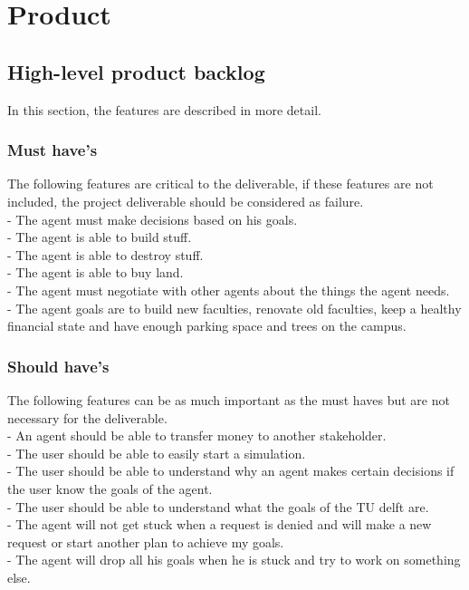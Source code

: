 \section{Product}
\subsection{High-level product backlog}
In this section, the features are described in more detail.

\subsubsection{Must have's}
The following features are critical to the deliverable, if these features are not included, the project deliverable should be considered as failure.\\
\indent	-        The agent must make decisions based on his goals.\\
\indent	-        The agent is able to build stuff.\\
\indent	-        The agent is able to destroy stuff.\\
\indent	-        The agent is able to buy land.\\
\indent	-        The agent must negotiate with other agents about the things the agent 
\indent		needs.\\
\indent	-        The agent goals are to build new faculties, renovate old faculties, keep 
\indent	a healthy financial state and have enough parking space and trees on the
\indent campus.

\subsubsection{Should have's}
The following features can be as much important as the must haves but are not necessary for the deliverable.\\
\indent-        An agent should be able to transfer money to another stakeholder.\\
\indent-        The user should be able to easily start a simulation.\\
\indent-        The user should be able to understand why an agent makes certain 
\indent		decisions if the user know the goals of the agent.\\
\indent-        The user should be able to understand what the goals of the TU delft 
\indent		are.\\
\indent-        The agent will not get stuck when a request is denied and will make a 
\indent	new request or start another plan to achieve my goals.\\
\indent-        The agent will drop all his goals when he is stuck and try to work on 
\indent	something else.\\

